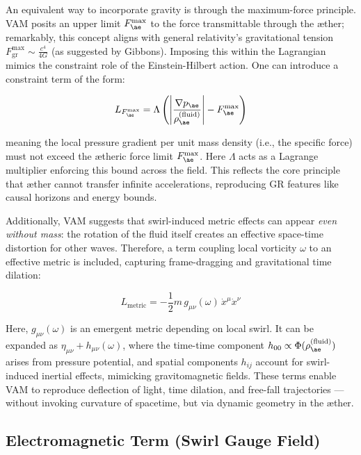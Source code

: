An equivalent way to incorporate gravity is through the maximum-force principle. VAM posits an upper limit \( F_{\ae}^{\max} \) to the force transmittable through the æther; remarkably, this concept aligns with general relativity's gravitational tension \( F_{\text{gr}}^{\max} \sim \frac{c^4}{4G} \) (as suggested by Gibbons). Imposing this within the Lagrangian mimics the constraint role of the Einstein-Hilbert action. One can introduce a constraint term of the form:

\begin{equation}
    L_{F_{\ae}^{\max}} = \Lambda\left(\left|\frac{\nabla p_{\ae}}{\rho_{\ae}^{(\text{fluid})}}\right| - F_{\ae}^{\max}\right)
    \label{eq:max-force-constraint}
\end{equation}

meaning the local pressure gradient per unit mass density (i.e., the specific force) must not exceed the ætheric force limit \( F_{\ae}^{\max} \). Here \( \Lambda \) acts as a Lagrange multiplier enforcing this bound across the field. This reflects the core principle that æther cannot transfer infinite accelerations, reproducing GR features like causal horizons and energy bounds.

Additionally, VAM suggests that swirl-induced metric effects can appear \emph{even without mass}: the rotation of the fluid itself creates an effective space-time distortion for other waves. Therefore, a term coupling local vorticity \( \omega \) to an effective metric is included, capturing frame-dragging and gravitational time dilation:

\begin{equation}
    L_{\text{metric}} = -\frac{1}{2}m\, g_{\mu\nu}(\omega) \, \dot{x}^\mu \dot{x}^\nu
    \label{eq:metric-vorticity}
\end{equation}

Here, \( g_{\mu\nu}(\omega) \) is an emergent metric depending on local swirl. It can be expanded as \( \eta_{\mu\nu} + h_{\mu\nu}(\omega) \), where the time-time component \( h_{00} \propto \Phi(\rho_{\ae}^{(\text{fluid})}) \) arises from pressure potential, and spatial components \( h_{ij} \) account for swirl-induced inertial effects, mimicking gravitomagnetic fields. These terms enable VAM to reproduce deflection of light, time dilation, and free-fall trajectories — without invoking curvature of spacetime, but via dynamic geometry in the æther.

\subsection{Electromagnetic Term (Swirl Gauge Field)}

